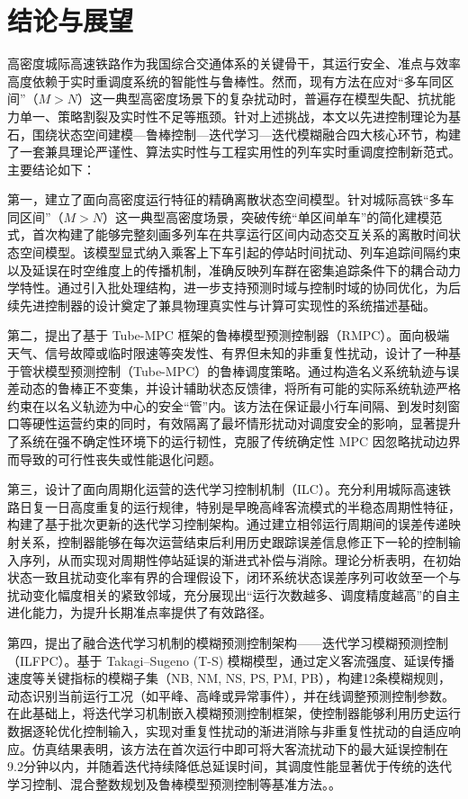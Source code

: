 \section{结论与展望}
\label{sec:conclusion}

高密度城际高速铁路作为我国综合交通体系的关键骨干，其运行安全、准点与效率高度依赖于实时重调度系统的智能性与鲁棒性。然而，现有方法在应对“多车同区间”（$M > N$）这一典型高密度场景下的复杂扰动时，普遍存在模型失配、抗扰能力单一、策略割裂及实时性不足等瓶颈。针对上述挑战，本文以先进控制理论为基石，围绕状态空间建模—鲁棒控制—迭代学习—迭代模糊融合四大核心环节，构建了一套兼具理论严谨性、算法实时性与工程实用性的列车实时重调度控制新范式。主要结论如下：

第一，建立了面向高密度运行特征的精确离散状态空间模型。针对城际高铁“多车同区间”（$M > N$）这一典型高密度场景，突破传统“单区间单车”的简化建模范式，首次构建了能够完整刻画多列车在共享运行区间内动态交互关系的离散时间状态空间模型。该模型显式纳入乘客上下车引起的停站时间扰动、列车追踪间隔约束以及延误在时空维度上的传播机制，准确反映列车群在密集追踪条件下的耦合动力学特性。通过引入批处理结构，进一步支持预测时域与控制时域的协同优化，为后续先进控制器的设计奠定了兼具物理真实性与计算可实现性的系统描述基础。

第二，提出了基于 Tube-MPC 框架的鲁棒模型预测控制器（RMPC）。面向极端天气、信号故障或临时限速等突发性、有界但未知的非重复性扰动，设计了一种基于管状模型预测控制（Tube-MPC）的鲁棒调度策略。通过构造名义系统轨迹与误差动态的鲁棒正不变集，并设计辅助状态反馈律，将所有可能的实际系统轨迹严格约束在以名义轨迹为中心的安全“管”内。该方法在保证最小行车间隔、到发时刻窗口等硬性运营约束的同时，有效隔离了最坏情形扰动对调度安全的影响，显著提升了系统在强不确定性环境下的运行韧性，克服了传统确定性 MPC 因忽略扰动边界而导致的可行性丧失或性能退化问题。

第三，设计了面向周期化运营的迭代学习控制机制（ILC）。充分利用城际高速铁路日复一日高度重复的运行规律，特别是早晚高峰客流模式的半稳态周期性特征，构建了基于批次更新的迭代学习控制架构。通过建立相邻运行周期间的误差传递映射关系，控制器能够在每次运营结束后利用历史跟踪误差信息修正下一轮的控制输入序列，从而实现对周期性停站延误的渐进式补偿与消除。理论分析表明，在初始状态一致且扰动变化率有界的合理假设下，闭环系统状态误差序列可收敛至一个与扰动变化幅度相关的紧致邻域，充分展现出“运行次数越多、调度精度越高”的自主进化能力，为提升长期准点率提供了有效路径。

第四，提出了融合迭代学习机制的模糊预测控制架构——迭代学习模糊预测控制（ILFPC）。基于 Takagi–Sugeno (T-S) 模糊模型，通过定义客流强度、延误传播速度等关键指标的模糊子集（NB, NM, NS, PS, PM, PB），构建12条模糊规则，动态识别当前运行工况（如平峰、高峰或异常事件），并在线调整预测控制参数。在此基础上，将迭代学习机制嵌入模糊预测控制框架，使控制器能够利用历史运行数据逐轮优化控制输入，实现对重复性扰动的渐进消除与非重复性扰动的自适应响应。仿真结果表明，该方法在首次运行中即可将大客流扰动下的最大延误控制在9.2分钟以内，并随着迭代持续降低总延误时间，其调度性能显著优于传统的迭代学习控制、混合整数规划及鲁棒模型预测控制等基准方法。。

